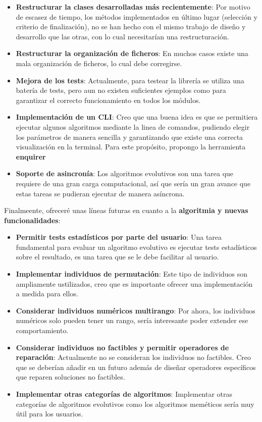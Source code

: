 \begin{itemize}
    \item \textbf{Restructurar la clases desarrolladas más recientemente}: Por motivo de escasez de tiempo, los métodos implementados en último lugar (selección y criterio de finalización), no se han hecho con el mismo trabajo de diseño y desarrollo que las otras, con lo cual necesitarían una restructuración.
    \item \textbf{Restructurar la organización de ficheros}: En muchos casos existe una mala organización de ficheros, lo cual debe corregirse.
    \item \textbf{Mejora de los tests}: Actualmente, para testear la librería se utiliza una batería de tests, pero aun no existen suficientes ejemplos como para garantizar el correcto funcionamiento en todos los módulos.
    \item \textbf{Implementación de un CLI}: Creo que una buena idea es que se permitiera ejecutar algunos algoritmos mediante la linea de comandos, pudiendo elegir los parámetros de manera sencilla y garantizando que existe una correcta visualización en la terminal. Para este propósito, propongo la herramienta \textbf{enquirer}
    \item \textbf{Soporte de asincronía}: Los algoritmos evolutivos son una tarea que requiere de una gran carga computacional, así que sería un gran avance que estas tareas se pudieran ejecutar de manera asíncrona.
\end{itemize}

Finalmeente, ofreceré unas líneas futuras en cuanto a la \textbf{algoritmia y nuevas funcionalidades}:

\begin{itemize}
    \item \textbf{Permitir tests estadísticos por parte del usuario}: Una tarea fundamental para evaluar un algoritmo evolutivo es ejecutar tests estadísticos sobre el resultado, es una tarea que se le debe facilitar al usuario.
    \item \textbf{Implementar individuos de permutación}: Este tipo de individuos son ampliamente ustilizados, creo que es importante ofrecer una implementación a medida para ellos.
    \item \textbf{Considerar individuos numéricos multirango}: Por ahora, los individuos numéricos solo pueden tener un rango, sería interesante poder extender ese comportamiento.
    \item \textbf{Considerar individuos no factibles y permitir operadores de reparación}: Actualmente no se consideran los individuos no factibles. Creo que se deberían añadir en un futuro además de diseñar operadores específicos que reparen soluciones no factibles.
    \item \textbf{Implementar otras categorías de algoritmos}: Implementar otras categorías de algoritmos evolutivos como los algoritmos meméticos sería muy útil para los usuarios.
\end{itemize}
